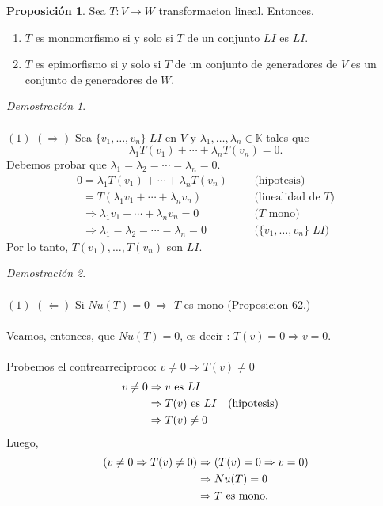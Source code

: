 \documentclass{article}
\theoremstyle{definition}
\theoremstyle{definition}
\newtheorem{prop}[teo]{Proposición}
\theoremstyle{remark}
\newtheorem*{demo}{Demostración}
\begin{document}
\begin{prop}
  Sea $T : V \to W$ transformacion lineal. Entonces, \begin{enumerate}[label=(\arabic*)]
    \item $T$ es monomorfismo si y solo si $T$ de un conjunto $LI$ es $LI$. 
    \item $T$ es epimorfismo si y solo si $T$ de un conjunto de generadores de $V$ es un conjunto de generadores de $W$.
  \end{enumerate}
\end{prop}
\begin{demo} \; \\\\
  $(1)$ $(\Rightarrow)$ Sea $\{v_1, \dots ,v_n\} \; LI$ en $V$ y $\lambda_1 , \dots ,\lambda_n \in \mathbb{K}$ tales que \[
\lambda_1 T(v_1)+\cdots + \lambda_n T(v_n)=0.
  \]
  Debemos probar que $\lambda_1 = \lambda_2 = \cdots = \lambda_n = 0$. \[
    \begin{array}{llll}
      0=\lambda_1 T(v_1)+ \cdots + \lambda_n T(v_n) &&& \text{(hipotesis)} \\
      \phantom{0}=T(\lambda_1 v_1 + \cdots + \lambda_n v_n) &&& \text{(linealidad de $T$)} \\
      \phantom{0}\Rightarrow \lambda_1 v_1 + \cdots + \lambda_n v_n = 0 &&& \text{($T$ mono)} \\
      \phantom{0}\Rightarrow \lambda_1 = \lambda_2 = \cdots = \lambda_n = 0 &&& \text{($\{v_1, \dots ,v_n \}\; LI$)}
    \end{array}
  \]
  Por lo tanto, $T(v_1), \dots , T(v_n)$ son $LI$.
\end{demo} \; \begin{demo}\;\\\\
  $(1)$ $(\Leftarrow)$ Si $Nu(T)=0$ \; $\Rightarrow$ \; $T$ es mono (Proposicion 62.) \\\\ Veamos, entonces, que $Nu(T)=0$, es decir : $T(v)=0 \Rightarrow v=0$. \\\\ Probemos el contrearreciproco: $v \neq 0 \Rightarrow T(v) \neq 0$ \begin{align}
    v \neq 0 &\Rightarrow v \text{ es }LI \notag \\
             &\Rightarrow T(v) \text{ es }LI &&\text{(hipotesis)} \notag \\
             &\Rightarrow T(v) \neq 0 \notag
  \end{align}
  Luego, \begin{align}
    (v \neq 0 \Rightarrow T(v) \neq 0) &\Rightarrow (T(v)=0\Rightarrow v =0) \notag \\
                                       &\Rightarrow Nu(T)=0\notag  \\
                                       &\Rightarrow T \text{ es mono}. \notag 
  \end{align}
\end{demo}
\pagebreak
\end{document}

